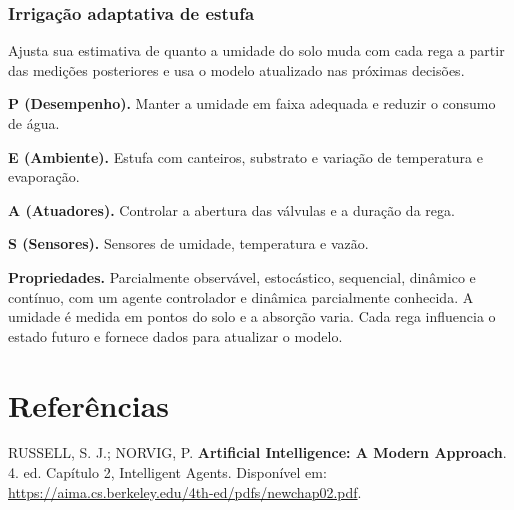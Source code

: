 \documentclass[12pt,a4paper]{article}
\begin{document}
\subsubsection{Irrigação adaptativa de estufa}

Ajusta sua estimativa de quanto a umidade do solo muda com cada rega a partir das medições posteriores e usa o modelo atualizado nas próximas decisões.

\textbf{P (Desempenho).} Manter a umidade em faixa adequada e reduzir o consumo de água.

\textbf{E (Ambiente).} Estufa com canteiros, substrato e variação de temperatura e evaporação.

\textbf{A (Atuadores).} Controlar a abertura das válvulas e a duração da rega.

\textbf{S (Sensores).} Sensores de umidade, temperatura e vazão.

\textbf{Propriedades.} Parcialmente observável, estocástico, sequencial, dinâmico e contínuo, com um agente controlador e dinâmica parcialmente conhecida. A umidade é medida em pontos do solo e a absorção varia. Cada rega influencia o estado futuro e fornece dados para atualizar o modelo.

\section*{Referências}

\noindent [1] RUSSELL, S. J.; NORVIG, P. \textbf{Artificial Intelligence: A Modern Approach}. 4. ed. Capítulo 2, Intelligent Agents. Disponível em: \url{https://aima.cs.berkeley.edu/4th-ed/pdfs/newchap02.pdf}.
\end{document}

